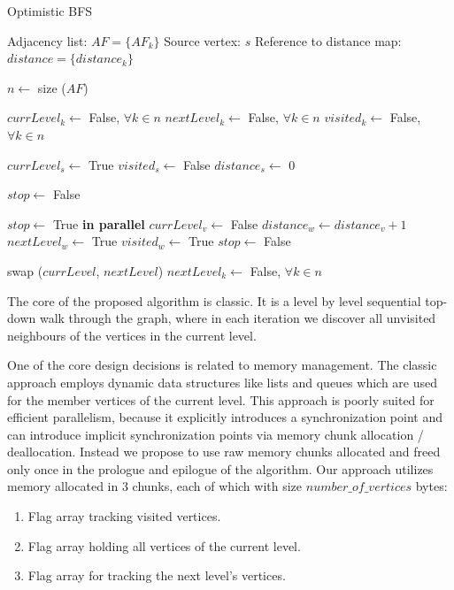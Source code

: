 \documentclass[letterpaper]{article}
\begin{document}
			\begin{algorithm}[ht]
				\caption{Optimistic BFS}
				\label{alg:optbfs}
				\begin{algorithmic}[1]
					\Require
						\Statex Adjacency list: $AF = \lbrace AF_k \rbrace$
						\Statex Source vertex: $s$
						\Statex Reference to distance map: $distance = \lbrace distance_k \rbrace$
					\Statex

					\State $n \gets$ size ($AF$) 					
					
					\State $currLevel_k \gets$ False, $\forall k \in n$
					\State $nextLevel_k \gets$ False, $\forall k \in n$
					\State $visited_k \gets$ False, $\forall k \in n$
					\Statex
					
					\State $currLevel_s \gets$ True
					\State $visited_s \gets$ False
					\State $distance_s \gets$ 0
					\Statex
					
					\State $stop \gets$ False
					\Statex
					
						\State $stop\gets$ True
						 \textbf{in parallel}
								\State $currLevel_v \gets$ False
										\State $distance_w \gets distance_v + 1$
										\State $nextLevel_w \gets$ True
										\State $visited_w \gets$ True
										\State $stop \gets$ False
									\EndIf
								\EndFor
							\EndIf
						\EndFor
						
						\vspace{-0.051cm} %
						
						\State swap ($currLevel$, $nextLevel$)
						\State $nextLevel_k \gets$ False, $\forall k\in n$
					\EndWhile
				\end{algorithmic}
			\end{algorithm}
			
			The core of the proposed algorithm is classic.
			It is a level by level sequential top-down walk through the graph, where in each iteration we discover all unvisited neighbours of the vertices in the current level.
			
			One of the core design decisions is related to memory management.
			The classic approach employs dynamic data structures like lists and queues which are used for the member vertices of the current level.
			This approach is poorly suited for efficient parallelism, because it explicitly introduces a synchronization point and can introduce implicit synchronization points via memory chunk allocation / deallocation. 
			Instead we propose to use raw memory chunks allocated and freed only once in the prologue and epilogue of the algorithm.
			Our approach utilizes memory allocated in 3 chunks, each of which with size $number\_of\_vertices$ bytes:
			\begin{enumerate}
				\item Flag array tracking visited vertices.
				\item Flag array holding all vertices of the current level.
				\item Flag array for tracking the next level's vertices.
			\end{enumerate}
			
\end{document}
